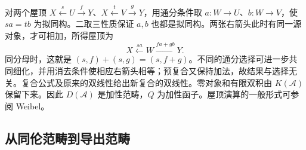对两个屋顶 \(X\xleftarrow{s}U\xrightarrow{f}Y\)、\(X\xleftarrow{t}V\xrightarrow{g}Y\)，用通分条件取 \(a:W\to U\)、\(b:W\to V\)，使 \(sa=tb\) 为拟同构。二取三性质保证 \(a,b\) 也都是拟同构。两张右箭头此时有同一源对象，才可相加，所得屋顶为
\[
	X\xleftarrow{sa}W\xrightarrow{fa+gb}Y.
\]
同分母时，这就是 \((s,f)+(s,g)=(s,f+g)\)。不同的通分选择可进一步共同细化，并用消去条件使相应右箭头相等；预复合又保持加法，故结果与选择无关。复合公式及原来的双线性给出新复合的双线性。零对象和有限双积由 \(K(\mathcal A)\) 保留下来。因此 \(D(\mathcal A)\) 是加性范畴，\(Q\) 为加性函子。屋顶演算的一般形式可参阅 Weibel\cite[Theorem 10.3.7; Corollaries 10.3.8--10.3.11]{Weibel1994HomologicalAlgebra}。

\subsection{从同伦范畴到导出范畴}
\label{b4:subsec:1702:03}

